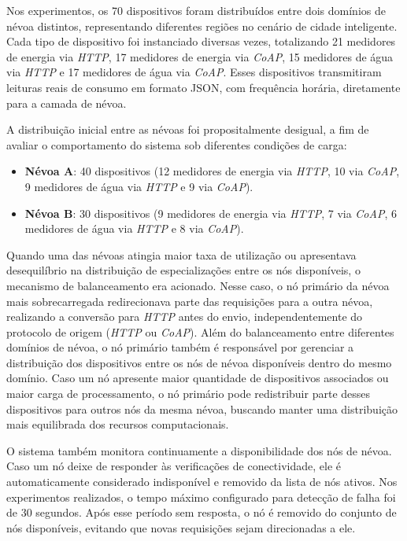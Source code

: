Nos experimentos, os 70 dispositivos foram distribuídos entre dois domínios de névoa distintos, representando diferentes regiões no cenário de cidade inteligente.  
Cada tipo de dispositivo foi instanciado diversas vezes, totalizando 21 medidores de energia via \textit{HTTP}, 17 medidores de energia via \textit{CoAP}, 15 medidores de água via \textit{HTTP} e 17 medidores de água via \textit{CoAP}.  
Esses dispositivos transmitiram leituras reais de consumo em formato \gls{JSON}, com frequência horária, diretamente para a camada de névoa.

A distribuição inicial entre as névoas foi propositalmente desigual, a fim de avaliar o comportamento do sistema sob diferentes condições de carga:

\begin{itemize}
    \item \textbf{Névoa A}: 40 dispositivos  
    (12 medidores de energia via \textit{HTTP}, 10 via \textit{CoAP}, 9 medidores de água via \textit{HTTP} e 9 via \textit{CoAP}).
    \item \textbf{Névoa B}: 30 dispositivos  
    (9 medidores de energia via \textit{HTTP}, 7 via \textit{CoAP}, 6 medidores de água via \textit{HTTP} e 8 via \textit{CoAP}).
\end{itemize}

Quando uma das névoas atingia maior taxa de utilização ou apresentava desequilíbrio na distribuição de especializações entre os nós disponíveis, o mecanismo de balanceamento era acionado. Nesse caso, o nó primário da névoa mais sobrecarregada redirecionava parte das requisições para a outra névoa, realizando a conversão para \textit{HTTP} antes do envio, independentemente do protocolo de origem (\textit{HTTP} ou \textit{CoAP}). Além do balanceamento entre diferentes domínios de névoa, o nó primário também é responsável por gerenciar a distribuição dos dispositivos entre os nós de névoa disponíveis dentro do mesmo domínio. Caso um nó apresente maior quantidade de dispositivos associados ou maior carga de processamento, o nó primário pode redistribuir parte desses dispositivos para outros nós da mesma névoa, buscando manter uma distribuição mais equilibrada dos recursos computacionais.

O sistema também monitora continuamente a disponibilidade dos nós de névoa. Caso um nó deixe de responder às verificações de conectividade, ele é automaticamente considerado indisponível e removido da lista de nós ativos. Nos experimentos realizados, o tempo máximo configurado para detecção de falha foi de 30 segundos. Após esse período sem resposta, o nó é removido do conjunto de nós disponíveis, evitando que novas requisições sejam direcionadas a ele.

